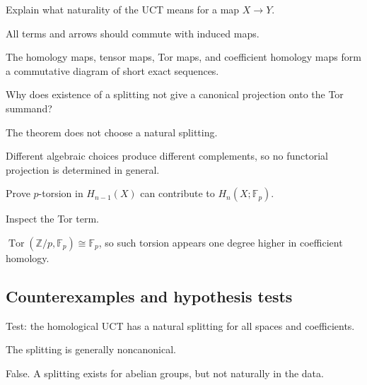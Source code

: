 \begin{exercise}[Naturality]\label{exr:viii26-ped-07}
Explain what naturality of the UCT means for a map $X\to Y$.
\end{exercise}
\begin{hint}
All terms and arrows should commute with induced maps.
\end{hint}
\begin{solution}
The homology maps, tensor maps, Tor maps, and coefficient homology maps form a commutative diagram of short exact sequences.
\end{solution}

\begin{exercise}\label{exr:viii26-ped-08}
Why does existence of a splitting not give a canonical projection onto the Tor summand?
\end{exercise}
\begin{hint}
The theorem does not choose a natural splitting.
\end{hint}
\begin{solution}
Different algebraic choices produce different complements, so no functorial projection is determined in general.
\end{solution}

\begin{exercise}\label{exr:viii26-ped-09}
Prove $p$-torsion in $H_{n-1}(X)$ can contribute to $H_n(X;\mathbb F_p)$.
\end{exercise}
\begin{hint}
Inspect the Tor term.
\end{hint}
\begin{solution}
$\operatorname{Tor}(\mathbb Z/p,\mathbb F_p)\cong\mathbb F_p$, so such torsion appears one degree higher in coefficient homology.
\end{solution}

\subsection*{Counterexamples and hypothesis tests}

\begin{exercise}\label{exr:viii26-ped-10}
Test: the homological UCT has a natural splitting for all spaces and coefficients.
\end{exercise}
\begin{hint}
The splitting is generally noncanonical.
\end{hint}
\begin{solution}
False. A splitting exists for abelian groups, but not naturally in the data.
\end{solution}

